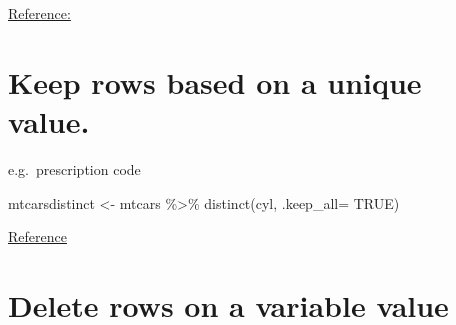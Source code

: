 \documentclass[
]{book}
\newenvironment{Shaded}{\begin{snugshade}}{\end{snugshade}}
\newcommand{\AttributeTok}[1]{\textcolor[rgb]{0.77,0.63,0.00}{#1}}
\newcommand{\CommentTok}[1]{\textcolor[rgb]{0.56,0.35,0.01}{\textit{#1}}}
\newcommand{\ConstantTok}[1]{\textcolor[rgb]{0.00,0.00,0.00}{#1}}
\newcommand{\DecValTok}[1]{\textcolor[rgb]{0.00,0.00,0.81}{#1}}
\newcommand{\FunctionTok}[1]{\textcolor[rgb]{0.00,0.00,0.00}{#1}}
\newcommand{\NormalTok}[1]{#1}
\newcommand{\OtherTok}[1]{\textcolor[rgb]{0.56,0.35,0.01}{#1}}
\newcommand{\SpecialCharTok}[1]{\textcolor[rgb]{0.00,0.00,0.00}{#1}}
\begin{document}
\begin{Shaded}
\end{Shaded}

\href{http://r-statistics.co/Missing-Value-Treatment-With-R.html}{Reference:}

\hypertarget{keep-rows-based-on-a-unique-value.}{%
\section{Keep rows based on a unique value.}\label{keep-rows-based-on-a-unique-value.}}

e.g.~prescription code

\begin{Shaded}
\begin{Highlighting}[]
\NormalTok{mtcarsdistinct }\OtherTok{\textless{}{-}}\NormalTok{ mtcars }\SpecialCharTok{\%\textgreater{}\%}    \FunctionTok{distinct}\NormalTok{(cyl, }\AttributeTok{.keep\_all=} \ConstantTok{TRUE}\NormalTok{)}
\end{Highlighting}
\end{Shaded}

\href{http://www.datasciencemadesimple.com/remove-duplicate-rows-r-using-dplyr-distinct-function}{Reference}

\hypertarget{delete-rows-on-a-variable-value}{%
\section{Delete rows on a variable value}\label{delete-rows-on-a-variable-value}}
\end{document}

